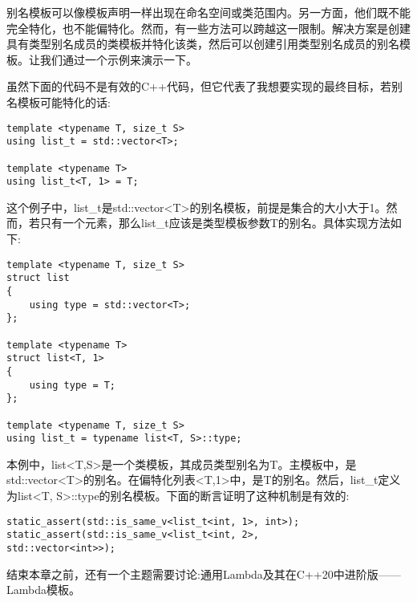 别名模板可以像模板声明一样出现在命名空间或类范围内。另一方面，他们既不能完全特化，也不能偏特化。然而，有一些方法可以跨越这一限制。解决方案是创建具有类型别名成员的类模板并特化该类，然后可以创建引用类型别名成员的别名模板。让我们通过一个示例来演示一下。

虽然下面的代码不是有效的C++代码，但它代表了我想要实现的最终目标，若别名模板可能特化的话:

\begin{lstlisting}[style=styleCXX]
template <typename T, size_t S>
using list_t = std::vector<T>;

template <typename T>
using list_t<T, 1> = T;
\end{lstlisting}

这个例子中，list\_t是std::vector<T>的别名模板，前提是集合的大小大于1。然而，若只有一个元素，那么list\_t应该是类型模板参数T的别名。具体实现方法如下:

\begin{lstlisting}[style=styleCXX]
template <typename T, size_t S>
struct list
{
	using type = std::vector<T>;
};

template <typename T>
struct list<T, 1>
{
	using type = T;
};

template <typename T, size_t S>
using list_t = typename list<T, S>::type;
\end{lstlisting}

本例中，list<T,S>是一个类模板，其成员类型别名为T。主模板中，是std::vector<T>的别名。在偏特化列表<T,1>中，是T的别名。然后，list\_t定义为list<T, S>::type的别名模板。下面的断言证明了这种机制是有效的:

\begin{lstlisting}[style=styleCXX]
static_assert(std::is_same_v<list_t<int, 1>, int>);
static_assert(std::is_same_v<list_t<int, 2>,
std::vector<int>>);
\end{lstlisting}

结束本章之前，还有一个主题需要讨论:通用Lambda及其在C++20中进阶版——Lambda模板。




















